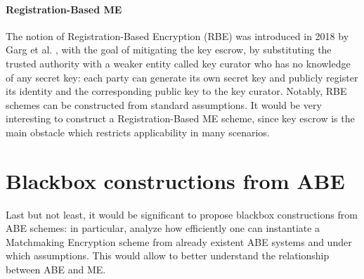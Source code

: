 \paragraph{Registration-Based ME}
The notion of Registration-Based Encryption (RBE) was introduced in 2018 by Garg et al. \cite{Garg}, with the goal of mitigating the key escrow, by substituting the trusted authority with a weaker entity called key curator who has no knowledge of any secret key: each party can generate its own secret key and publicly register its identity and the corresponding public key to the key curator. Notably, RBE schemes can be constructed from standard assumptions.
It would be very interesting to construct a Registration-Based ME scheme, since key escrow is the main obstacle which restricts applicability in many scenarios.

\section{Blackbox constructions from ABE}
Last but not least, it would be significant to propose blackbox constructions from ABE schemes: in particular, analyze how efficiently one can instantiate a Matchmaking Encryption scheme from already existent ABE systems and under which assumptions.
This would allow to better understand the relationship between ABE and ME.
